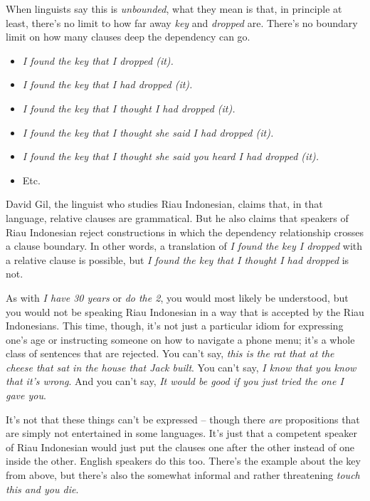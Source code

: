 When linguists say this is \textit{unbounded}, what they mean is that, in principle at least, there's no limit to how far away \textit{key} and \textit{dropped} are. There's no boundary limit on how many clauses deep the dependency can go.
\begin{itemize}
    \item \textit{I found the key that I dropped (it).}
    \item \textit{I found the key that I had dropped (it).}
    \item \textit{I found the key that I thought I had dropped (it).}
    \item \textit{I found the key that I thought she said I had dropped (it).}
    \item \textit{I found the key that I thought she said you heard I had dropped (it).}
    \item Etc.
\end{itemize}

David Gil, the linguist who studies Riau Indonesian, claims that, in that language, relative clauses are grammatical. But he also claims that speakers of Riau Indonesian reject constructions in which the dependency relationship crosses a clause boundary. In other words, a translation of \textit{I found the key I dropped} with a relative clause is possible, but \textit{I found the key that I thought I had dropped} is not. 

As with \textit{I have 30 years} or \textit{do the 2}, you would most likely be understood, but you would not be speaking Riau Indonesian in a way that is accepted by the Riau Indonesians. This time, though, it's not just a particular idiom for expressing one's age or instructing someone on how to navigate a phone menu; it's a whole class of sentences that are rejected. You can't say, \textit{this is the rat that at the cheese that sat in the house that Jack built}. You can't say, \textit{I know that you know that it's wrong}. And you can't say, \textit{It would be good if you just tried the one I gave you}. 

It's not that these things can't be expressed -- though there \textit{are} propositions that are simply not entertained in some languages. It's just that a competent speaker of Riau Indonesian would just put the clauses one after the other instead of one inside the other. English speakers do this too. There's the example about the key from above, but there's also the somewhat informal and rather threatening \textit{touch this and you die}.

